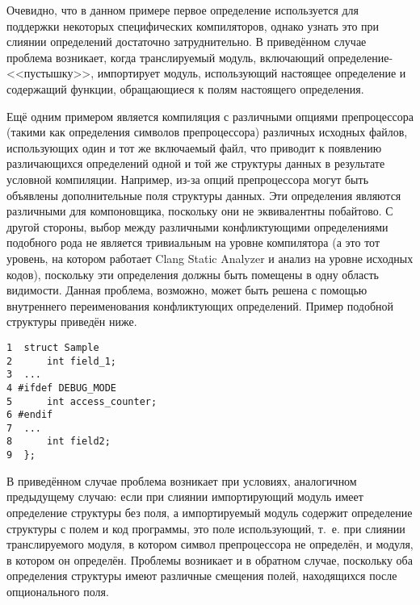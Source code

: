 Очевидно, что в данном примере первое определение используется для поддержки некоторых специфических компиляторов, однако узнать это при слиянии определений достаточно затруднительно. В приведённом случае проблема возникает, когда транслируемый модуль, включающий определение-<<пустышку>>, импортирует модуль, использующий настоящее определение и содержащий функции, обращающиеся к полям настоящего определения.

Ещё одним примером является компиляция с различными опциями препроцессора (такими как определения символов препроцессора) различных исходных файлов, использующих один и тот же включаемый файл, что приводит к появлению различающихся определений одной и той же структуры данных в результате условной компиляции. Например, из-за опций препроцессора могут быть объявлены дополнительные поля структуры данных. Эти определения являются различными для компоновщика, поскольку они не эквивалентны побайтово. С другой стороны, выбор между различными конфликтующими определениями подобного рода не является тривиальным на уровне компилятора (а это тот уровень, на котором работает Clang Static Analyzer и анализ на уровне исходных кодов), поскольку эти определения должны быть помещены в одну область видимости. Данная проблема, возможно, может быть решена с помощью внутреннего переименования конфликтующих определений. Пример подобной структуры приведён ниже.

\begin{verbatim}
1  struct Sample
2      int field_1;
3  ...
4 #ifdef DEBUG_MODE
5      int access_counter;
6 #endif
7  ...
8      int field2;
9  };
\end{verbatim}

В приведённом случае проблема возникает при условиях, аналогичном предыдущему случаю: если при слиянии импортирующий модуль имеет определение структуры без поля, а импортируемый модуль  содержит определение структуры с полем и код программы, это поле использующий, т.~е. при слиянии транслируемого модуля, в котором символ препроцессора не определён, и модуля, в котором он определён. Проблемы возникает и в обратном случае, поскольку оба определения структуры имеют различные смещения полей, находящихся после опционального поля.


